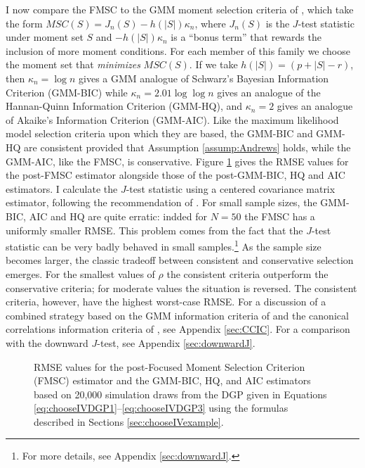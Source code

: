 I now compare the FMSC to the GMM moment selection criteria of \cite{Andrews1999}, which take the form $MSC(S) = J_n(S) - h(|S|)\kappa_n$, where $J_n(S)$ is the $J$-test statistic under moment set $S$ and $-h(|S|)\kappa_n$ is a ``bonus term'' that rewards the inclusion of more moment conditions.
For each member of this family we choose the moment set that \emph{minimizes} $MSC(S)$. 
If we take $h(|S|) = (p + |S| - r)$, then $\kappa_n = \log{n}$ gives a GMM analogue of Schwarz's Bayesian Information Criterion (GMM-BIC) while $\kappa_n = 2.01 \log{\log{n}}$ gives an analogue of the Hannan-Quinn Information Criterion (GMM-HQ), and $\kappa_n = 2$ gives an analogue of Akaike's Information Criterion (GMM-AIC). 
Like the maximum likelihood model selection criteria upon which they are based, the GMM-BIC and GMM-HQ are consistent provided that Assumption \ref{assump:Andrews} holds, while the GMM-AIC, like the FMSC, is conservative.
Figure \ref{fig:chooseIVsim_RMSErelMSC} gives the RMSE values for the post-FMSC estimator alongside those of the post-GMM-BIC, HQ and AIC estimators.
I calculate the $J$-test statistic using a centered covariance matrix estimator, following the recommendation of \cite{Andrews1999}.
For small sample sizes, the GMM-BIC, AIC and HQ are quite erratic: indded for $N = 50$ the FMSC has a uniformly smaller RMSE.
This problem comes from the fact that the $J$-test statistic can be very badly behaved in small samples.\footnote{For more details, see Appendix \ref{sec:downwardJ}.}
As the sample size becomes larger, the classic tradeoff between consistent and conservative selection emerges.
For the smallest values of $\rho$ the consistent criteria outperform the conservative criteria; for moderate values the situation is reversed.
The consistent criteria, however, have the highest worst-case RMSE.
For a discussion of a combined strategy based on the GMM information criteria of \cite{Andrews1999} and the canonical correlations information criteria of \cite{HallPeixe2003}, see Appendix \ref{sec:CCIC}.
For a comparison with the downward $J$-test, see Appendix \ref{sec:downwardJ}.
\begin{figure}
\centering
	
	\caption{RMSE values for the post-Focused Moment Selection Criterion (FMSC) estimator and the GMM-BIC, HQ, and AIC estimators based on 20,000 simulation draws from the DGP given in Equations \ref{eq:chooseIVDGP1}--\ref{eq:chooseIVDGP3} using the formulas described in Sections \ref{sec:chooseIVexample}.}
	\label{fig:chooseIVsim_RMSErelMSC}
\end{figure}
